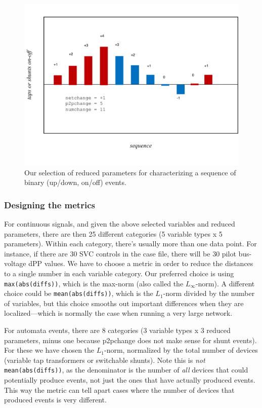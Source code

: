 \documentclass[conference]{IEEEtran}
\newcommand{\code}[1]{\texttt{#1}}
\begin{document}
\begin{figure}
  \centering
  \includegraphics[width=\columnwidth]{figs/transient_characteristics_2}
  \caption{Our selection of reduced parameters for characterizing a
    sequence of binary (up/down, on/off) events.}
  \label{fig:tcharacteristics2}
\end{figure}


\subsubsection{Designing the metrics}
\label{sssec:metrics}
For continuous signals, and given the above selected variables and reduced
parameters, there are then 25 different categories (5 variable types x 5
parameters). Within each category, there's usually more than one data point. For
instance, if there are 30 SVC controls in the case file, there will be 30 pilot
bus-voltage dPP values. We have to choose a metric in order to reduce the
distances to a single number in each variable category. Our preferred choice is
using \code{max(abs(diffs))}, which is the max-norm (also called the
$L_\infty$-norm).  A different choice could be \code{mean(abs(diffs))}, which is
the $L_1$-norm divided by the number of variables, but this choice smooths out
important differences when they are localized---which is normally the case when
running a very large network.

For automata events, there are 8 categories (3 variable types x 3 reduced
parameters, minus one because p2pchange does not make sense for shunt
events). For these we have chosen the $L_1$-norm, normalized by the total number
of devices (variable tap transformers or switchable shunts). Note this is
\emph{not} \code{mean(abs(diffs))}, as the denominator is the number of
\emph{all} devices that could potentially produce events, not just the ones that
have actually produced events. This way the metric can tell apart cases where
the number of devices that produced events is very different.
\end{document}
